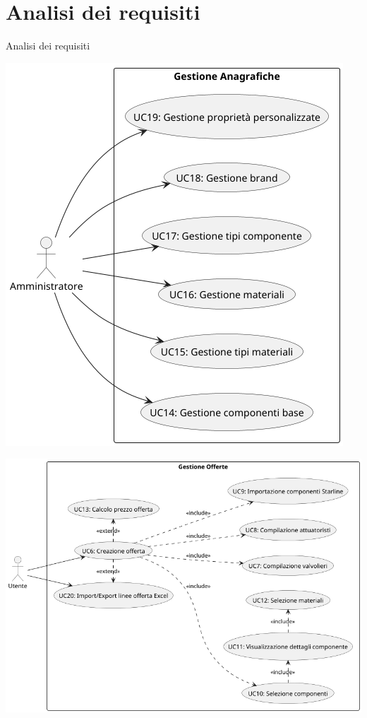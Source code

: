 \documentclass{beamer}
\begin{document}
\section{Analisi dei requisiti}
\begin{frame}{Analisi dei requisiti}
    \begin{center}
        \begin{minipage}{0.32\textwidth}
            \centering
            \includegraphics[width=\linewidth]{images/usecase/gestione_anagrafiche.png}\\
        \end{minipage}
        \hfill
        \begin{minipage}{0.50\textwidth}
            \centering
            \includegraphics[width=\linewidth]{images/usecase/gestione_offerte.png}\\

\end{minipage}
\end{center}
\end{frame}
\end{document}
